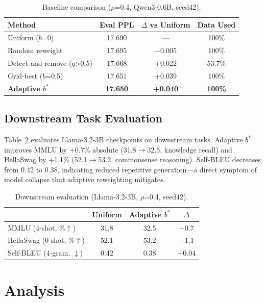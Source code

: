 \documentclass[11pt]{article}
\begin{document}
\begin{table}[t]
\centering
\caption{Baseline comparison ($\rho$=0.4, Qwen3-0.6B, seed42).}
\label{tab:baselines}
\small
\begin{tabular}{l ccc}
\toprule
Method & Eval PPL & $\Delta$ vs Uniform & Data Used \\
\midrule
Uniform ($b$=0) & 17.690 & --- & 100\% \\
Random reweight & 17.695 & $-$0.005 & 100\% \\
Detect-and-remove ($q$>0.5) & 17.668 & +0.022 & 53.7\% \\
Grid-best ($b$=0.5) & 17.651 & +0.039 & 100\% \\
\textbf{Adaptive $b^*$} & \textbf{17.650} & \textbf{+0.040} & \textbf{100\%} \\
\bottomrule
\end{tabular}
\end{table}

\subsection{Downstream Task Evaluation}
\label{sec:downstream}

Table~\ref{tab:downstream} evaluates Llama-3.2-3B checkpoints on downstream tasks. Adaptive $b^*$ improves MMLU by +0.7\% absolute (31.8$\to$32.5, knowledge recall) and HellaSwag by +1.1\% (52.1$\to$53.2, commonsense reasoning). Self-BLEU decreases from 0.42 to 0.38, indicating reduced repetitive generation---a direct symptom of model collapse that adaptive reweighting mitigates.

\begin{table}[t]
\centering
\caption{Downstream evaluation (Llama-3.2-3B, $\rho$=0.4, seed42).}
\label{tab:downstream}
\small
\begin{tabular}{l ccc}
\toprule
& Uniform & Adaptive $b^*$ & $\Delta$ \\
\midrule
MMLU (4-shot, \%$\uparrow$) & 31.8 & 32.5 & +0.7 \\
HellaSwag (0-shot, \%$\uparrow$) & 52.1 & 53.2 & +1.1 \\
Self-BLEU (4-gram, $\downarrow$) & 0.42 & 0.38 & $-$0.04 \\
\bottomrule
\end{tabular}
\end{table}

\section{Analysis}
\label{sec:analysis}
\end{document}
